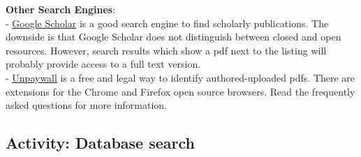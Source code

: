 \documentclass[
]{book}
\theoremstyle{definition}
\theoremstyle{definition}
\theoremstyle{definition}
\theoremstyle{definition}
\theoremstyle{remark}
\begin{document}
\begin{reflect}
\textbf{Other Search Engines}:\\
- \href{https://scholar.google.com/}{Google Scholar} is a good search engine to find scholarly publications. The downside is that Google Scholar does not distinguish between closed and open resources. However, search results which show a pdf next to the listing will probably provide access to a full text version.\\
- \href{https://unpaywall.org/}{Unpaywall} is a free and legal way to identify authored-uploaded pdfs. There are extensions for the Chrome and Firefox open source browsers. Read the frequently asked questions for more information.
\end{reflect}

\hypertarget{activity-database-search}{%
\subsection*{Activity: Database search}\label{activity-database-search}}
\end{document}
